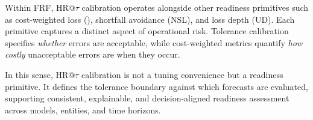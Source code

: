 Within FRF, HR@$\tau$ calibration operates alongside other readiness primitives
such as cost-weighted loss (\CWSL{}), shortfall avoidance (NSL), and loss depth
(UD).
Each primitive captures a distinct aspect of operational risk.
Tolerance calibration specifies \emph{whether} errors are acceptable, while
cost-weighted metrics quantify \emph{how costly} unacceptable errors are when
they occur.

In this sense, HR@$\tau$ calibration is not a tuning convenience but a readiness
primitive.
It defines the tolerance boundary against which forecasts are evaluated,
supporting consistent, explainable, and decision-aligned readiness assessment
across models, entities, and time horizons.
